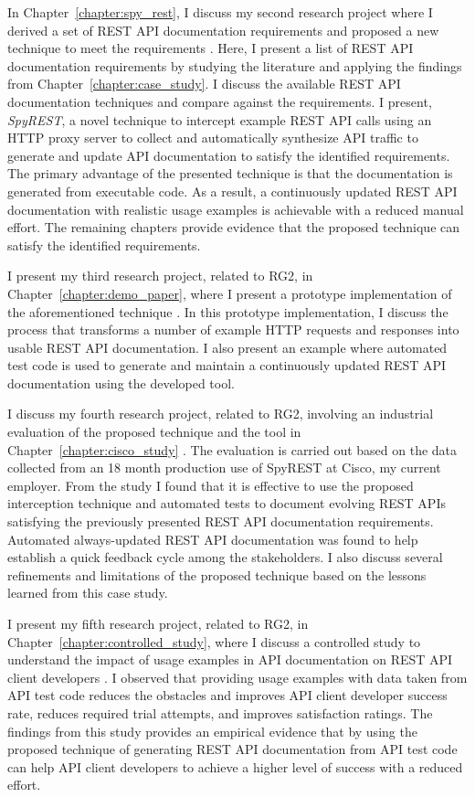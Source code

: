 In Chapter~\ref{chapter:spy_rest}, I discuss my second research project where I derived a set of REST API documentation requirements and proposed a new technique to meet the requirements \cite{sohan2015spyrest}. Here, I present a list of REST API documentation requirements by studying the literature and applying the findings from Chapter~\ref{chapter:case_study}. I discuss the available REST API documentation techniques and compare against the requirements. I present, \textit{SpyREST}, a novel technique to intercept example REST API calls using an HTTP proxy server to collect and automatically synthesize API traffic to generate and update API documentation to satisfy the identified requirements. The primary advantage of the presented technique is that the documentation is generated from executable code. As a result, a continuously updated REST API documentation with realistic usage examples is achievable with a reduced manual effort. The remaining chapters provide evidence that the proposed technique can satisfy the identified requirements.

I present my third research project, related to RG2, in Chapter~\ref{chapter:demo_paper}, where I present a prototype implementation of the aforementioned technique \cite{sohan2015spyrest_tool}. In this prototype implementation, I discuss the process that transforms a number of example HTTP requests and responses into usable REST API documentation. I also present an example where automated test code is used to generate and maintain a continuously updated REST API documentation using the developed tool.

I discuss my fourth research project, related to RG2, involving an industrial evaluation of the proposed technique and the tool in Chapter~\ref{chapter:cisco_study} \cite{sohan_cisco}. The evaluation is carried out based on the data collected from an 18 month production use of SpyREST at Cisco, my current employer. From the study I found that it is effective to use the proposed interception technique and automated tests to document evolving REST APIs satisfying the previously presented REST API documentation requirements. Automated always-updated REST API documentation was found to help establish a quick feedback cycle among the stakeholders. I also discuss several refinements and limitations of the proposed technique based on the lessons learned from this case study.

I present my fifth research project, related to RG2, in Chapter~\ref{chapter:controlled_study}, where I discuss a controlled study to understand the impact of usage examples in API documentation on REST API client developers \cite{sohan_vlhcc}. I observed that providing usage examples with data taken from API test code reduces the obstacles and improves API client developer success rate, reduces required trial attempts, and improves satisfaction ratings. The findings from this study provides an empirical evidence that by using the proposed technique of generating REST API documentation from API test code can help API client developers to achieve a higher level of success with a reduced effort.

